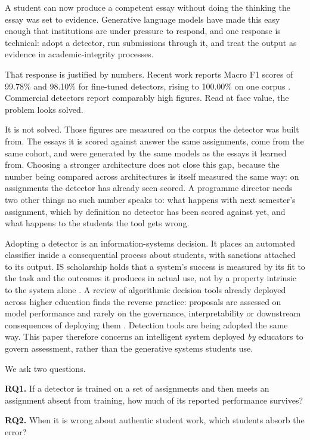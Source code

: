 \documentclass[11pt,a4paper]{article}
\begin{document}
A student can now produce a competent essay without doing the thinking the
essay was set to evidence. Generative language models have made this easy
enough that institutions are under pressure to respond, and one response
is technical: adopt a detector, run submissions through it, and treat the
output as evidence in academic-integrity processes.

That response is justified by numbers. Recent work reports Macro F1 scores
of 99.78\% and 98.10\% for fine-tuned detectors, rising to 100.00\% on one
corpus \cite{qorich2025}. Commercial detectors report comparably high
figures. Read at face value, the problem looks solved.

It is not solved. Those figures are measured on the corpus the detector was
built from. The essays it is scored against answer the same assignments,
come from the same cohort, and were generated by the same models as the
essays it learned from. Choosing a stronger architecture does not close
this gap, because the number being compared across architectures is
itself measured the same way: on assignments the detector has already
seen scored. A programme director needs two other things no such number
speaks to: what happens with next semester's assignment, which by
definition no detector has been scored against yet, and what happens to
the students the tool gets wrong.

Adopting a detector is an information-systems decision. It places an
automated classifier inside a consequential process about students, with
sanctions attached to its output. IS scholarship holds that a system's
success is measured by its fit to the task and the outcomes it produces in
actual use, not by a property intrinsic to the system alone
\cite{delone2003}. A review of algorithmic decision tools already deployed
across higher education finds the reverse practice: proposals are assessed
on model performance and rarely on the governance, interpretability or
downstream consequences of deploying them \cite{mcconvey2023}. Detection
tools are being adopted the same way. This paper therefore concerns an
intelligent system deployed \emph{by} educators to govern assessment,
rather than the generative systems students use.

We ask two questions.

\textbf{RQ1.} If a detector is trained on a set of assignments and then
meets an assignment absent from training, how much of its reported
performance survives?

\textbf{RQ2.} When it is wrong about authentic student work, which students
absorb the error?
\end{document}
